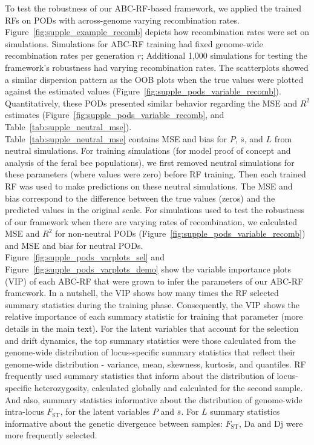 \documentclass[a4paper, 12pt]{article}
\begin{document}
To test the robustness of our ABC-RF-based framework, we applied the trained RFs on PODs with across-genome varying recombination rates. Figure~\ref{fig:supple_example_recomb} depicts how recombination rates were set on simulations. Simulations for ABC-RF training had fixed genome-wide recombination rates per generation $r$; Additional 1,000 simulations for testing the framework's robustness had varying recombination rates.
The scatterplots showed a similar dispersion pattern as the OOB plots when the true values were plotted against the estimated values (Figure~\ref{fig:supple_pods_variable_recomb}). Quantitatively, these PODs presented similar behavior regarding the MSE and $R^2$ estimates (Figure~\ref{fig:supple_pods_variable_recomb}, and Table~\ref{tab:supple_neutral_mse}).\\

Table~\ref{tab:supple_neutral_mse} contains MSE and bias for $P$, $\bar{s}$, and $L$ from neutral simulations. For training simulations (for model proof of concept and analysis of the feral bee populations), we first removed neutral simulations for these parameters (where values were zero) before RF training. Then each trained RF was used to make predictions on these neutral simulations. The MSE and bias correspond to the difference between the true values (zeros) and the predicted values in the original scale. For simulations used to test the robustness of our framework when there are varying rates of recombination, we calculated MSE and $R^2$ for non-neutral PODs (Figure~\ref{fig:supple_pods_variable_recomb}) and MSE and bias for neutral PODs.\\

Figure~\ref{fig:supple_pods_varplots_sel} and Figure~\ref{fig:supple_pods_varplots_demo} show the variable importance plots (VIP) of each ABC-RF that were grown to infer the parameters of our ABC-RF framework. In a nutshell, the VIP shows how many times the RF selected summary statistics during the training phase. Consequently, the VIP shows the relative importance of each summary statistic for training that parameter (more details in the main text). For the latent variables that account for the selection and drift dynamics, the top summary statistics were those calculated from the genome-wide distribution of locus-specific summary statistics that reflect their genome-wide distribution - variance, mean, skewness, kurtosis, and quantiles. RF frequently used summary statistics that inform about the distribution of locus-specific heterozygosity, calculated globally and calculated for the second sample. And also, summary statistics informative about the distribution of genome-wide intra-locus $F_{\mathrm{ST}}$, for the latent variables $P$ and $\bar{s}$. For $L$ summary statistics informative about the genetic divergence between samples: $F_{\mathrm{ST}}$, Da and Dj were more frequently selected.\\
\end{document}
